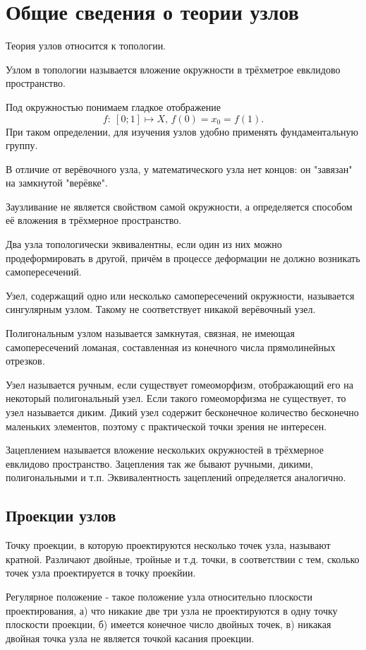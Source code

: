 \section{Общие сведения о теории узлов}

Теория узлов относится к топологии.

Узлом в топологии называется вложение окружности в трёхметрое евклидово пространство.

Под окружностью понимаем гладкое отображение
$$f:\: \left[0;1\right]\mapsto X,\, f(0) = x_0 = f(1).$$
При таком определении, для изучения узлов удобно применять фундаментальную группу.

В отличие от верёвочного узла, у математического узла нет концов: он "завязан" на замкнутой "верёвке".

Заузливание не является свойством самой окружности, а определяется способом её вложения в трёхмерное пространство.

Два узла топологически эквивалентны, если один из них можно продеформировать в другой, причём в процессе деформации не должно возникать самопересечений.

Узел, содержащий одно или несколько самопересечений окружности, называется сингулярным узлом. Такому не соответствует никакой верёвочный узел.

Полигональным узлом называется замкнутая, связная, не имеющая самопересечений ломаная, составленная из конечного числа прямолинейных отрезков.

Узел называется ручным, если существует гомеоморфизм, отображающий его на некоторый полигональный узел. Если такого гомеоморфизма не существует, то узел называется диким. Дикий узел содержит бесконечное количество бесконечно маленьких элементов, поэтому с практической точки зрения не интересен.

Зацеплением называется вложение нескольких окружностей в трёхмерное евклидово пространство. Зацепления так же бывают ручными, дикими, полигональными и т.п. Эквивалентность зацеплений определяется аналогично.

\subsection{Проекции узлов}

Точку проекции, в которую проектируются несколько точек узла, называют кратной. Различают двойные, тройные и т.д. точки, в соответствии с тем, сколько точек узла проектируется в точку проекйии.

Регулярное положение - такое положение узла относительно плоскости проектирования, 
а) что никакие две три узла не проектируются в одну точку плоскости проекции, б) имеется конечное число двойных точек, в) никакая двойная точка узла не является точкой касания проекции.

